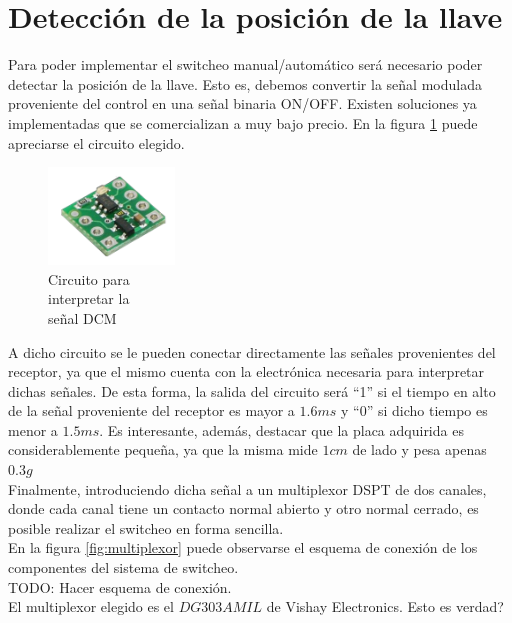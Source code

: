 \documentclass[main]{subfiles}
\begin{document}

\section{Detección de la posición de la llave}
Para poder implementar el switcheo manual/automático será necesario poder detectar la posición de la llave. Esto es, debemos convertir la señal modulada proveniente del control en una señal binaria ON/OFF. Existen soluciones ya implementadas que se comercializan a muy bajo precio. En la figura \ref{fig:circuito} puede apreciarse el circuito elegido.\\

\begin{figure}
\includegraphics[width=0.3\textwidth]{./pics_switcheo/placa.png}
\caption{Circuito para \\interpretar la \\señal DCM}
\label{fig:circuito}
\end{figure}

A dicho circuito se le pueden conectar directamente las señales provenientes del receptor, ya que el mismo cuenta con la electrónica necesaria para interpretar dichas señales. De esta forma, la salida del circuito será ``1'' si el tiempo en alto de la señal proveniente del receptor es mayor a $1.6ms$ y ``0'' si dicho tiempo es menor a $1.5ms$. Es interesante, además, destacar que la placa adquirida es considerablemente pequeña, ya que la misma mide $1cm$ de lado y pesa apenas $0.3g$\\




Finalmente, introduciendo dicha señal a un multiplexor DSPT de dos canales, donde cada canal tiene un contacto normal abierto y otro normal cerrado, es posible realizar el switcheo en forma sencilla.\\

En la figura \ref{fig:multiplexor} puede observarse el esquema de conexión de los componentes del sistema de switcheo.\\

TODO: Hacer esquema de conexión.\\

El multiplexor elegido es el $DG303AMIL$ de Vishay Electronics. Esto es verdad?
\end{document}
